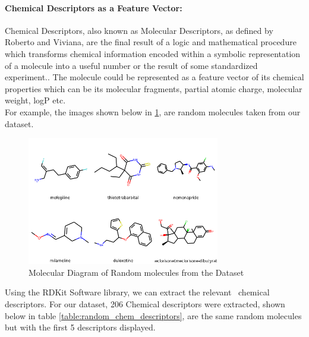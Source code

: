 \documentclass[a4paper,12pt]{report}
\begin{document}
				\paragraph{Chemical Descriptors as a Feature Vector:} 
				Chemical Descriptors, also known as Molecular Descriptors, as defined by Roberto and Viviana, are the final result of a logic and mathematical procedure which transforms chemical information encoded within a symbolic representation of a molecule into a useful number or the result of some standardized experiment.\cite{RobertoViviana2009}.
				The molecule could be represented as a feature vector of its chemical properties which can be its molecular fragments, partial atomic charge, molecular weight, logP etc. \\
				For example, the images shown below in \ref{fig:random_molecules}, are random molecules taken from our dataset.
					\begin{figure}[h!]
						\centering
						\includegraphics[width=0.75\textwidth,height=0.35\textheight]{images/random_molecules.png}
						\caption{Molecular Diagram of Random molecules from the Dataset}
						\label{fig:random_molecules}
					\end{figure}
				Using the RDKit Software library, we can extract the relevant ~chemical descriptors. For our dataset, 206 Chemical descriptors were extracted, shown below in table \ref{table:random_chem_descriptors}, are the same random molecules but with the first 5 descriptors displayed.
\end{document}

